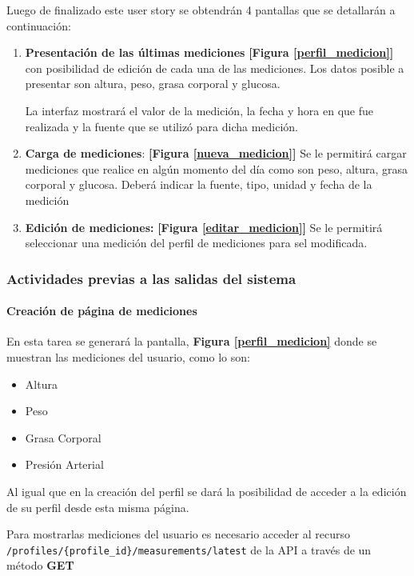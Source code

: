 Luego de finalizado este user story se obtendrán 4 pantallas que se detallarán a continuación:
\begin{enumerate}
    \item \textbf{Presentación de las últimas mediciones}  \textbf{[Figura  \ref{perfil_medicion}]} con posibilidad de edición de cada una de las mediciones. Los datos posible  a presentar son altura, peso, grasa corporal y glucosa. 
    
    La interfaz mostrará el valor de la medición, la fecha y hora en que fue realizada y la fuente que se utilizó para dicha medición.
	\item \textbf{Carga de mediciones}: \textbf{[Figura \ref{nueva_medicion}]} Se le permitirá cargar mediciones que realice en algún momento del día como son peso, altura, grasa corporal y glucosa. Deberá indicar la fuente, tipo, unidad y fecha de la medición
    \item \textbf{Edición de mediciones:}  \textbf{[Figura \ref{editar_medicion}]} Se le permitirá seleccionar una medición del perfil de mediciones para sel modificada.

\end{enumerate}

\clearpage
\subsubsection{Actividades previas a las salidas del sistema}

\paragraph{Creación de página de mediciones}
En esta tarea  se generará la pantalla, \textbf{Figura \ref{perfil_medicion}} donde se muestran las mediciones del usuario, como lo son:
\begin{itemize}
	\item Altura
	\item Peso
	\item Grasa Corporal
	\item Presión Arterial
\end{itemize}
Al igual que en la creación del perfil se dará la posibilidad de acceder a la edición de su perfil desde esta misma página.

\begin{sloppypar}
Para mostrarlas mediciones del usuario es necesario acceder al recurso \texttt{/profiles/\{profile\_id\}/measurements/latest} de la API a través de un método \textbf{GET}
\end{sloppypar}


